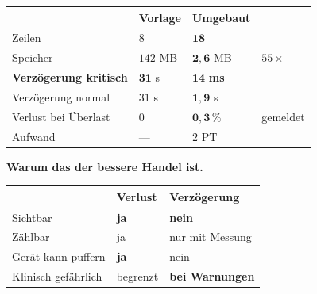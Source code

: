 \begin{merksatz}
\begin{center}
{\small
\renewcommand{\arraystretch}{1.45}
\begin{tabular}{@{}P{2.8cm}P{2.0cm}P{2.2cm}P{2.0cm}@{}}
\toprule
& \textbf{Vorlage} & \textbf{Umgebaut} & \\
\midrule
Zeilen & $8$ & $\mathbf{18}$ & \\
Speicher & $142$ MB & $\mathbf{2{,}6}$ MB & $55\times$\\
\textbf{Verzögerung kritisch} & \textcolor{akzent}{$\mathbf{31}$ s} & \textcolor{gruen}{$\mathbf{14}$ \textbf{ms}} & \\
Verzögerung normal & $31$ s & $\mathbf{1{,}9}$ s & \\
Verlust bei Überlast & $0$ & \textcolor{mittel}{$\mathbf{0{,}3\,\%}$} & \textcolor{mittel}{gemeldet}\\
Aufwand & --- & $2$ PT & \\
\bottomrule
\end{tabular}}
\end{center}

\begin{center}
\begin{minipage}{0.88\textwidth}
\end{minipage}
\end{center}

\textbf{Warum das der bessere Handel ist.}

\begin{center}
\renewcommand{\arraystretch}{1.45}
\begin{tabular}{@{}P{2.6cm}P{2.6cm}P{2.8cm}@{}}
\toprule
& \textbf{Verlust} & \textbf{Verzögerung}\\
\midrule
Sichtbar & \textcolor{gruen}{\textbf{ja}} & \textcolor{akzent}{\textbf{nein}}\\
Zählbar & \textcolor{gruen}{ja} & \textcolor{mittel}{nur mit Messung}\\
Gerät kann puffern & \textcolor{gruen}{\textbf{ja}} & \textcolor{akzent}{nein}\\
Klinisch gefährlich & \textcolor{mittel}{begrenzt} & \textcolor{akzent}{\textbf{bei Warnungen}}\\
\bottomrule
\end{tabular}
\end{center}

\begin{center}
\end{center}
\end{merksatz}

